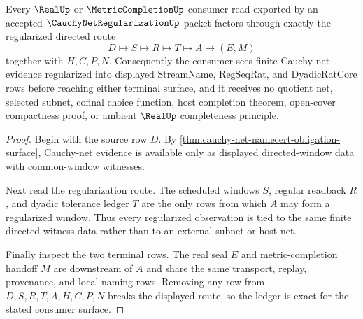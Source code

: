 \begin{theorem}
\label{thm:cauchy-net-regularization-ledger-exactness}
Every $\RealUp$ or $\MetricCompletionUp$ consumer read exported by an accepted $\CauchyNetRegularizationUp$ packet factors through exactly the regularized directed route
$$
D\longmapsto S\longmapsto R\longmapsto T\longmapsto A\longmapsto (E,M)
$$
together with $H,C,P,N$. Consequently the consumer sees finite Cauchy-net evidence regularized into displayed StreamName, RegSeqRat, and DyadicRatCore rows before reaching either terminal surface, and it receives no quotient net, selected subnet, cofinal choice function, host completion theorem, open-cover compactness proof, or ambient $\RealUp$ completeness principle.
\end{theorem}
\begin{proof}
Begin with the source row $D$. By \autoref{thm:cauchy-net-namecert-obligation-surface}, Cauchy-net evidence is available only as displayed directed-window data with common-window witnesses.

Next read the regularization route. The scheduled windows $S$, regular readback $R$, and dyadic tolerance ledger $T$ are the only rows from which $A$ may form a regularized window. Thus every regularized observation is tied to the same finite directed witness data rather than to an external subnet or host net.

Finally inspect the two terminal rows. The real seal $E$ and metric-completion handoff $M$ are downstream of $A$ and share the same transport, replay, provenance, and local naming rows. Removing any row from $D,S,R,T,A,H,C,P,N$ breaks the displayed route, so the ledger is exact for the stated consumer surface.
\end{proof}


\begin{closurestatus}{\CauchyNetRegularizationUp}
  \theoryclosure{\seedClosure}
  \formalstatus{\unformalizedV}
\end{closurestatus}
